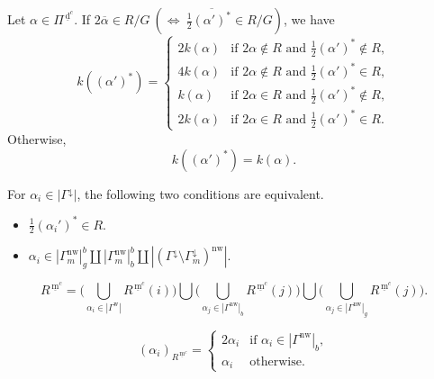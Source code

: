 \documentclass[10pt,a4paper]{amsart}
\newcommand{\dc}{\,\underline{\mathrm{d}}^c}
\newcommand{\mc}{\, \underline{\mathrm{m}}^c}
\newcommand{\nw}{\mathrm{nw}}
\newcommand{\w}{\mathrm{w}}
\begin{document}
\begin{prop}\label{prop:countings-prime}
Let $\alpha\in \Pi^{\dc}$. If $2\overline{\alpha}\in R/G\ \left(\Longleftrightarrow\ 
\frac12 \overline{(\alpha')^\ast}\in R/G\right)$, we have 
\begin{equation}\label{countings-alpha-prime}
k((\alpha')^\ast)=\begin{cases}
2k(\alpha) & \text{if } 2\alpha\not\in R\text{ and } \frac12 (\alpha')^\ast\not\in R,\\
4k(\alpha) & \text{if } 2\alpha\not\in R\text{ and }\frac12 (\alpha')^\ast\in R,\\
k(\alpha) & \text{if } 2\alpha\in R\text{ and }\frac12 (\alpha')^\ast\not\in R,\\
2k(\alpha) & \text{if } 2\alpha\in R\text{ and }\frac12 (\alpha')^\ast\in R.
\end{cases}
\end{equation}
Otherwise, 
\begin{equation}
k((\alpha')^\ast)=k(\alpha). 
\end{equation}
\end{prop}

\begin{lemma}\label{lemma:black-ast}
For $\alpha_i\in |\Gamma^\downarrow|$, the following two conditions are equivalent.
\begin{itemize}
\item[(a)] $\frac12 (\alpha_i')^\ast\in R$.
\vskip 1mm
\item[(b)] $\alpha_i\in |\Gamma^\nw_m|_g^b\amalg |\Gamma^\nw_m|_b^b\amalg 
|(\Gamma^{\downarrow}\setminus \Gamma^{\downarrow}_m)^\nw|$.
\end{itemize}
\end{lemma}

\begin{equation}\label{eq:description-Rmc}
R^{\mc}=\Big(\bigcup_{\alpha_i\in |\Gamma^\w|}R^{\mc}(i)\Big)\bigcup
\Big(\bigcup_{\alpha_j\in |\Gamma^\nw|_b}R^{\mc}(j)\Big)\bigcup
\Big(\bigcup_{\alpha_j\in |\Gamma^\nw|_g}R^{\mc}(j)\Big).
\end{equation}

\begin{equation}\label{eq:defn-(alpha)R''}
(\alpha_i)_{R^{\mc}}=\begin{cases}
2\alpha_i & \text{if $\alpha_i\in |\Gamma^\nw|_b$},\\
\alpha_i & \text{otherwise}. 
\end{cases}
\end{equation}
\end{document}
